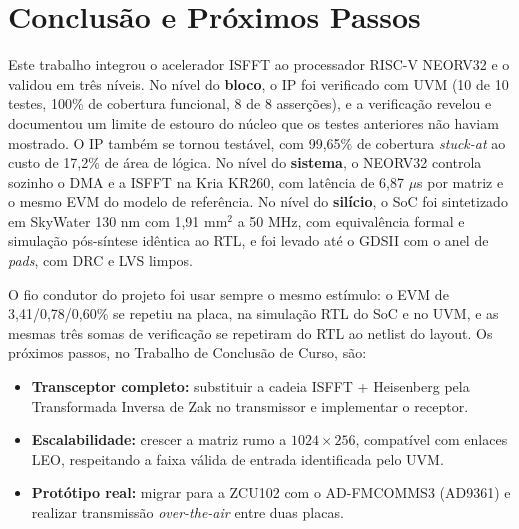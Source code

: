 \documentclass[conference]{IEEEtran}
\begin{document}
\section{Conclusão e Próximos Passos}

Este trabalho integrou o acelerador ISFFT ao processador RISC-V NEORV32 e o validou em três níveis. No nível do \textbf{bloco}, o IP foi verificado com UVM (10 de 10 testes, 100\% de cobertura funcional, 8 de 8 asserções), e a verificação revelou e documentou um limite de estouro do núcleo que os testes anteriores não haviam mostrado. O IP também se tornou testável, com 99,65\% de cobertura \textit{stuck-at} ao custo de 17,2\% de área de lógica. No nível do \textbf{sistema}, o NEORV32 controla sozinho o DMA e a ISFFT na Kria KR260, com latência de 6,87 $\mu$s por matriz e o mesmo EVM do modelo de referência. No nível do \textbf{silício}, o SoC foi sintetizado em SkyWater 130 nm com 1,91 mm$^2$ a 50 MHz, com equivalência formal e simulação pós-síntese idêntica ao RTL, e foi levado até o GDSII com o anel de \textit{pads}, com DRC e LVS limpos.

O fio condutor do projeto foi usar sempre o mesmo estímulo: o EVM de 3,41/0,78/0,60\% se repetiu na placa, na simulação RTL do SoC e no UVM, e as mesmas três somas de verificação se repetiram do RTL ao netlist do layout. Os próximos passos, no Trabalho de Conclusão de Curso, são:
\begin{itemize}
    \item \textbf{Transceptor completo:} substituir a cadeia ISFFT + Heisenberg pela Transformada Inversa de Zak no transmissor e implementar o receptor.
    \item \textbf{Escalabilidade:} crescer a matriz rumo a $1024 \times 256$, compatível com enlaces LEO, respeitando a faixa válida de entrada identificada pelo UVM.
    \item \textbf{Protótipo real:} migrar para a ZCU102 com o AD-FMCOMMS3 (AD9361) e realizar transmissão \textit{over-the-air} entre duas placas.
\end{itemize}
\end{document}
